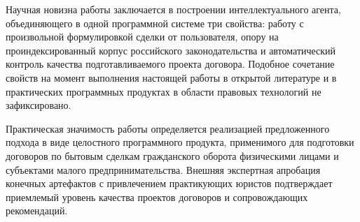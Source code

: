 Научная новизна работы заключается в построении интеллектуального агента, объединяющего в одной программной системе три свойства: работу с произвольной формулировкой сделки от пользователя, опору на проиндексированный корпус российского законодательства и автоматический контроль качества подготавливаемого проекта договора. Подобное сочетание свойств на момент выполнения настоящей работы в открытой литературе и в практических программных продуктах в области правовых технологий не зафиксировано.

Практическая значимость работы определяется реализацией предложенного подхода в виде целостного программного продукта, применимого для подготовки договоров по бытовым сделкам гражданского оборота физическими лицами и субъектами малого предпринимательства. Внешняя экспертная апробация конечных артефактов с привлечением практикующих юристов подтверждает приемлемый уровень качества проектов договоров и сопровождающих рекомендаций.
